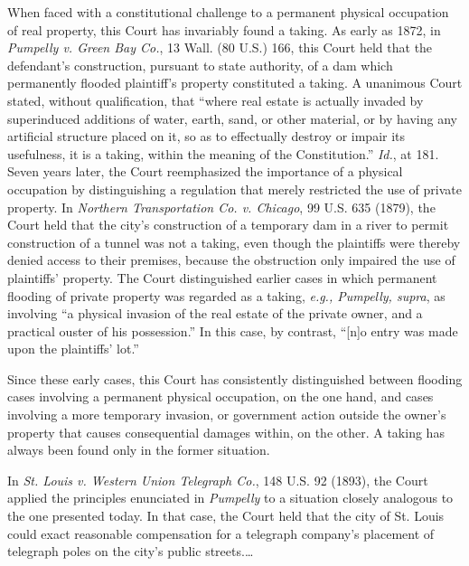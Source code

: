 When faced with a constitutional challenge to a permanent physical occupation of
real property, this Court has invariably found a taking. As early as 1872, in
\textit{Pumpelly v. Green Bay Co.}, 13 Wall. (80 U.S.) 166, this Court held that
the defendant's construction, pursuant to state authority, of a dam which
permanently flooded plaintiff's property constituted a taking. A unanimous Court
stated, without qualification, that ``where real estate is actually invaded by
superinduced additions of water, earth, sand, or other material, or by having
any artificial structure placed on it, so as to effectually destroy or impair
its usefulness, it is a taking, within the meaning of the Constitution.''
\textit{Id.}, at 181. Seven years later, the Court reemphasized the importance
of a physical occupation by distinguishing a regulation that merely restricted
the use of private property. In \textit{Northern Transportation Co. v. Chicago},
99 U.S. 635 (1879), the Court held that the city's construction of a temporary
dam in a river to permit construction of a tunnel was not a taking, even though
the plaintiffs were thereby denied access to their premises, because the
obstruction only impaired the use of plaintiffs' property. The Court
distinguished earlier cases in which permanent flooding of private property was
regarded as a taking, \textit{e.g., Pumpelly, supra}, as involving ``a physical
invasion of the real estate of the private owner, and a practical ouster of his
possession.'' In this case, by contrast, ``[n]o entry was made upon the
plaintiffs' lot.'' 

Since these early cases, this Court has consistently distinguished between
flooding cases involving a permanent physical occupation, on the one hand, and
cases involving a more temporary invasion, or government action outside the
owner's property that causes consequential damages within, on the other. A
taking has always been found only in the former situation.

In \textit{St. Louis v. Western Union Telegraph Co.}, 148 U.S. 92 (1893), the
Court applied the principles enunciated in \textit{Pumpelly} to a situation
closely analogous to the one presented today. In that case, the Court held that
the city of St. Louis could exact reasonable compensation for a telegraph
company's placement of telegraph poles on the city's public streets.\ldots 

